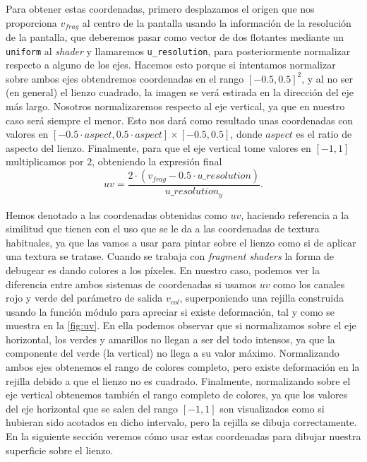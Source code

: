 Para obtener estas coordenadas, primero desplazamos el origen que nos proporciona $v_{frag}$ al centro de la pantalla usando la información de la resolución de la pantalla, que deberemos pasar como vector de dos flotantes mediante un \texttt{uniform} al \textit{shader} y llamaremos \texttt{u\_resolution}, para posteriormente normalizar respecto a alguno de los ejes. Hacemos esto porque si intentamos normalizar sobre ambos ejes obtendremos coordenadas en el rango $[-0.5,0.5]^2$, y al no ser (en general) el lienzo cuadrado, la imagen se verá estirada en la dirección del eje más largo. Nosotros normalizaremos respecto al eje vertical, ya que en nuestro caso será siempre el menor. Esto nos dará como resultado unas coordenadas con valores en $\left[ -0.5\cdot aspect, 0.5\cdot aspect \right] \times [-0.5, 0.5]$, donde $aspect$ es el ratio de aspecto del lienzo. Finalmente, para que el eje vertical tome valores en $[-1,1]$ multiplicamos por $2$, obteniendo la expresión final
\begin{equation*}
    uv = \frac{2\cdot(v_{frag} - 0.5\cdot u\_resolution)}{u\_resolution_y}.
\end{equation*}

Hemos denotado a las coordenadas obtenidas como $uv$, haciendo referencia a la similitud que tienen con el uso que se le da a las coordenadas de textura habituales, ya que las vamos a usar para pintar sobre el lienzo como si de aplicar una textura se tratase. Cuando se trabaja con \textit{fragment shaders} la forma de debugear es dando colores a los píxeles. En nuestro caso, podemos ver la diferencia entre ambos sistemas de coordenadas si usamos $uv$ como los canales rojo y verde del parámetro de salida $v_{col}$, superponiendo una rejilla construida usando la función módulo para apreciar si existe deformación, tal y como se muestra en la \autoref{fig:uv}. En ella podemos observar que si normalizamos sobre el eje horizontal, los verdes y amarillos no llegan a ser del todo intensos, ya que la componente del verde (la vertical) no llega a su valor máximo. Normalizando ambos ejes obtenemos el rango de colores completo, pero existe deformación en la rejilla debido a que el lienzo no es cuadrado. Finalmente, normalizando sobre el eje vertical obtenemos también el rango completo de colores, ya que los valores del eje horizontal que se salen del rango $[-1,1]$ son visualizados como si hubieran sido acotados en dicho intervalo, pero la rejilla se dibuja correctamente. En la siguiente sección veremos cómo usar estas coordenadas para dibujar nuestra superficie sobre el lienzo.
\newline

